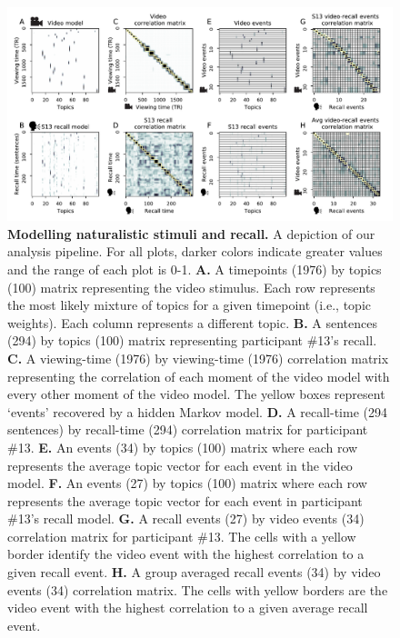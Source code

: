 \documentclass{article}
\begin{document}
\begin{figure}[t!]
\centering
\includegraphics[width=\textwidth]{figs/2_eventseg.pdf}
\caption{\small \textbf{Modelling naturalistic stimuli and recall.} A depiction of our analysis pipeline. For all plots, darker colors indicate greater values and the range of each plot is 0-1.  \textbf{A.} A timepoints (1976) by topics (100) matrix representing the video stimulus.  Each row represents the most likely mixture of topics for a given timepoint (i.e., topic weights). Each column represents a different topic. \textbf{B.} A sentences (294) by topics (100) matrix representing participant \#13's recall. \textbf{C.} A viewing-time (1976) by viewing-time (1976) correlation matrix representing the correlation of each moment of the video model with every other moment of the video model. The yellow boxes represent `events' recovered by a hidden Markov model. \textbf{D.} A recall-time (294 sentences) by recall-time (294) correlation matrix for participant \#13. \textbf{E.} An events (34) by topics (100) matrix where each row represents the average topic vector for each event in the video model.  \textbf{F.} An events (27) by topics (100) matrix where each row represents the average topic vector for each event in participant \#13's recall model. \textbf{G.} A recall events (27) by video events (34) correlation matrix for participant \#13. The cells with a yellow border identify the video event with the highest correlation to a given recall event. \textbf{H.} A group averaged recall events (34) by video events (34) correlation matrix.  The cells with yellow borders are the video event with the highest correlation to a given average recall event.}
\label{fig:model}
\end{figure}
\end{document}
